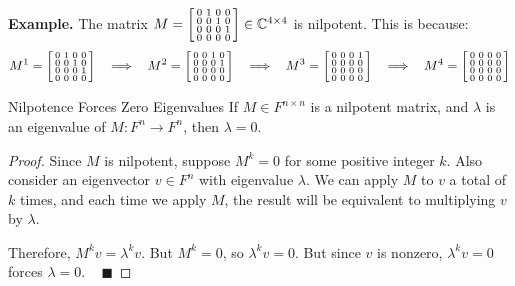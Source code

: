 \textbf{Example.} The matrix $M = \begin{bsmallmatrix} 0 & 1 & 0 & 0 \\ 0 & 0 & 1 & 0 \\ 0 & 0 & 0 & 1 \\ 0 & 0 & 0 & 0 \end{bsmallmatrix} \in \mathbb{C}^{4 \times 4}$ is nilpotent.  This is because:
\[ M^1 = \begin{bsmallmatrix} 0 & 1 & 0 & 0 \\ 0 & 0 & 1 & 0 \\ 0 & 0 & 0 & 1 \\ 0 & 0 & 0 & 0 \end{bsmallmatrix} ~~ \implies ~~ M^2  = \begin{bsmallmatrix} 0 & 0 & 1 & 0 \\ 0 & 0 & 0 & 1 \\ 0 & 0 & 0 & 0 \\ 0 & 0 & 0 & 0 \end{bsmallmatrix} ~~ \implies ~~ M^3 = \begin{bsmallmatrix} 0 & 0 & 0 & 1 \\ 0 & 0 & 0 & 0 \\ 0 & 0 & 0 & 0 \\ 0 & 0 & 0 & 0 \end{bsmallmatrix} ~~ \implies ~~ M^4 = \begin{bsmallmatrix} 0 & 0 & 0 & 0 \\ 0 & 0 & 0 & 0 \\ 0 & 0 & 0 & 0 \\ 0 & 0 & 0 & 0 \end{bsmallmatrix} \]

\begin{theorem}{Nilpotence Forces Zero Eigenvalues}
    If $M \in F^{n \times n}$ is a nilpotent matrix, and $\lambda$ is an eigenvalue of $M: F^n \to F^n$, then $\lambda = 0$.
\end{theorem}

\begin{proof}
    Since $M$ is nilpotent, suppose $M^k = 0$ for some positive integer $k$.  Also consider an eigenvector $v \in F^n$ with eigenvalue $\lambda$.  We can apply $M$ to $v$ a total of $k$ times, and each time we apply $M$, the result will be equivalent to multiplying $v$ by $\lambda$.

    Therefore, $M^kv = \lambda^k v$.  But $M^k = 0$, so $\lambda^k v = 0$.  But since $v$ is nonzero, $\lambda^k v = 0$ forces $\lambda = 0$. ~ $\blacksquare$
\end{proof}

